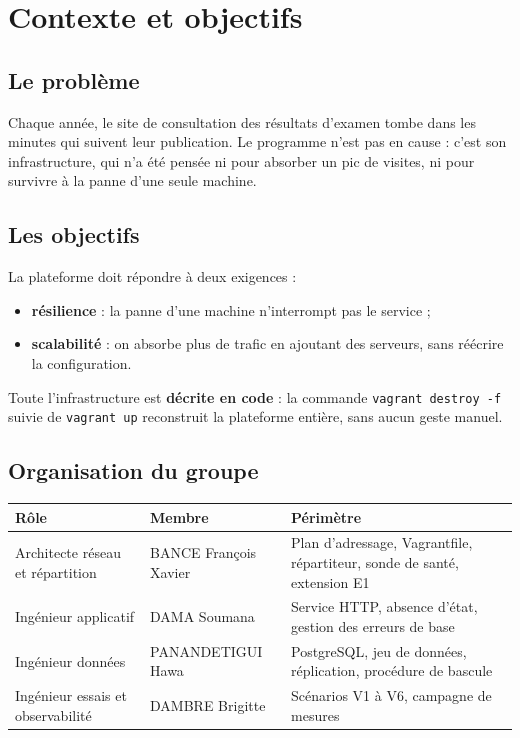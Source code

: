 \documentclass[11pt,a4paper,oneside]{report}
\newcommand{\cmd}[1]{\texttt{#1}}
\newcommand{\auteur}[1]{\par\noindent{\small\itshape Rédaction : #1}\par\medskip}
\begin{document}
	\chapter{Contexte et objectifs}
	\auteur{Le groupe}
	
	\section{Le problème}
	
	Chaque année, le site de consultation des résultats d'examen tombe dans les minutes qui suivent
	leur publication. Le programme n'est pas en cause : c'est son infrastructure, qui n'a été pensée
	ni pour absorber un pic de visites, ni pour survivre à la panne d'une seule machine.
	
	\section{Les objectifs}
	
	La plateforme doit répondre à deux exigences :
	\begin{itemize}
		\item \textbf{résilience} : la panne d'une machine n'interrompt pas le service ;
		\item \textbf{scalabilité} : on absorbe plus de trafic en ajoutant des serveurs, sans réécrire
		la configuration.
	\end{itemize}
	Toute l'infrastructure est \textbf{décrite en code} : la commande \cmd{vagrant destroy -f}
	suivie de \cmd{vagrant up} reconstruit la plateforme entière, sans aucun geste manuel.
	
	\section{Organisation du groupe}
	
	\begin{table}[H]\centering\small
		\begin{tabularx}{\textwidth}{@{}l l X@{}}
			\toprule
			\textbf{Rôle} & \textbf{Membre} & \textbf{Périmètre} \\
			\midrule
			Architecte réseau et répartition & BANCE François Xavier & Plan d'adressage, Vagrantfile, répartiteur, sonde de santé, extension E1 \\
			Ingénieur applicatif & DAMA Soumana & Service HTTP, absence d'état, gestion des erreurs de base \\
			Ingénieur données & PANANDETIGUI Hawa & PostgreSQL, jeu de données, réplication, procédure de bascule \\
			Ingénieur essais et observabilité & DAMBRE Brigitte & Scénarios V1 à V6, campagne de mesures \\
			\bottomrule
		\end{tabularx}
	\end{table}
	
\end{document}
